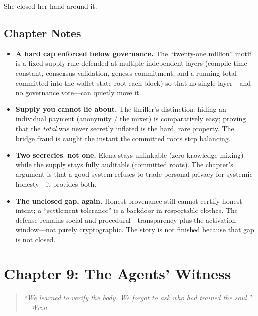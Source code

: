 \documentclass[12pt,letterpaper]{book}
\providecommand{\tightlist}{\setlength{\itemsep}{0pt}\setlength{\parskip}{0pt}}
\begin{document}
She closed her hand around it.

\hypertarget{chapter-8-notes}{%
\subsection{Chapter Notes}\label{chapter-8-notes}}

\begin{itemize}
\tightlist
\item
  \textbf{A hard cap enforced below governance.} The ``twenty-one million''
  motif is a fixed-supply rule defended at multiple independent layers
  (compile-time constant, consensus validation, genesis commitment, and a
  running total committed into the wallet state root each block) so that no
  single layer---and no governance vote---can quietly move it.
\item
  \textbf{Supply you cannot lie about.} The thriller's distinction: hiding an
  individual payment (anonymity / the mixer) is comparatively easy; proving that
  the \emph{total} was never secretly inflated is the hard, rare property. The
  bridge fraud is caught the instant the committed roots stop balancing.
\item
  \textbf{Two secrecies, not one.} Elena stays unlinkable (zero-knowledge
  mixing) while the supply stays fully auditable (committed roots). The chapter's
  argument is that a good system refuses to trade personal privacy for systemic
  honesty---it provides both.
\item
  \textbf{The unclosed gap, again.} Honest provenance still cannot certify
  honest intent; a ``settlement tolerance'' is a backdoor in respectable
  clothes. The defense remains social and procedural---transparency plus the
  activation window---not purely cryptographic. The story is not finished
  because that gap is not closed.
\end{itemize}


\hypertarget{chapter-9-the-agents-witness}{%
\section{Chapter 9: The Agents'
Witness}\label{chapter-9-the-agents-witness}}

\begin{quote}
\itshape ``We learned to verify the body. We forgot to ask who had trained the
soul.''\\
\normalfont\hfill---Wren
\end{quote}
\end{document}
